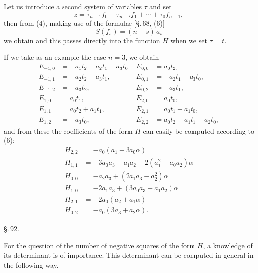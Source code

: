 
Let us introduce a second system of variables $\tau$ and set
\[
z = \tau_{n-1} f_0 + \tau_{n-2} f_1 + \cdots + \tau_0 f_{n-1},
\]
then from (4), making use of the formulae [\S.\,68, (6)]
\[
S(f_s) = (n-s)\,a_s
\]
we obtain
and this passes directly into the function $H$ when we set $\tau = t$.

If we take as an example the case $n = 3$, we obtain
\[
\begin{aligned}
E_{-1,0} &= -a_1 t_2 - a_2 t_1 - a_3 t_0, & E_{0,0} &= a_0 t_2, \\
E_{-1,1} &= -a_2 t_2 - a_3 t_1, & E_{0,1} &= -a_2 t_1 - a_3 t_0, \\
E_{-1,2} &= -a_3 t_2, & E_{0,2} &= -a_3 t_1, \\
E_{1,0} &= a_0 t_1, & E_{2,0} &= a_0 t_0, \\
E_{1,1} &= a_0 t_2 + a_1 t_1, & E_{2,1} &= a_0 t_1 + a_1 t_0, \\
E_{1,2} &= -a_3 t_0, & E_{2,2} &= a_0 t_2 + a_1 t_1 + a_2 t_0,
\end{aligned}
\]
and from these the coefficients of the form $H$ can easily be computed according to (6):
\[
\begin{aligned}
H_{2,2} &= -a_0 (a_1 + 3 a_0 \alpha) \\
H_{1,1} &= -3 a_0 a_3 - a_1 a_2 - 2(a_1^2 - a_0 a_2)\alpha \\
H_{0,0} &= -a_2 a_3 + (2 a_1 a_3 - a_2^2)\alpha \\
H_{1,0} &= -2 a_1 a_3 + (3 a_0 a_3 - a_1 a_2)\alpha \\
H_{2,1} &= -2 a_0 (a_2 + a_1 \alpha) \\
H_{0,2} &= -a_0 (3 a_3 + a_2 \alpha).
\end{aligned}
\]

\begin{center}
\S.\,92.

\end{center}

For the question of the number of negative squares of the form $H$, a knowledge of its determinant is of importance. This determinant can be computed in general in the following way.
